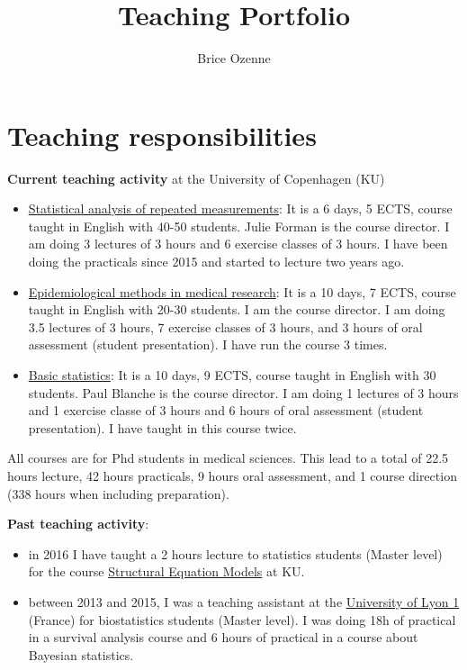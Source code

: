 \documentclass[12pt]{article}
\author{Brice Ozenne}
\date{}
\title{Teaching Portfolio}
\begin{document}
\maketitle

\section{Teaching responsibilities}
\label{sec:org6fdb8e1}

\textbf{Current teaching activity} at the University of Copenhagen (KU) 
\begin{itemize}
\item \href{https://absalon.ku.dk/courses/47665}{Statistical analysis of repeated measurements}: It is a 6
days, 5 ECTS, course taught in English with 40-50 students. Julie
Forman is the course director. \newline I am doing 3 lectures of 3
hours and 6 exercise classes of 3 hours. I have been doing the
practicals since 2015 and started to lecture two years ago.
\item \href{https://absalon.ku.dk/courses/58764}{Epidemiological methods in medical research}: It is a 10
days, 7 ECTS, course taught in English with 20-30 students. I am the
course director. \newline I am doing 3.5 lectures of 3 hours, 7
exercise classes of 3 hours, and 3 hours of oral assessment (student
presentation). I have run the course 3 times.
\item \href{http://paulblanche.com/files/BasicStat2023.html}{Basic statistics}: It is a 10 days, 9 ECTS, course taught in
English with 30 students. Paul Blanche is the course
director. \newline I am doing 1 lectures of 3 hours and 1 exercise
classe of 3 hours and 6 hours of oral assessment (student
presentation). I have taught in this course twice.
\end{itemize}

All courses are for Phd students in medical sciences. This lead to a
total of 22.5 hours lecture, 42 hours practicals, 9 hours oral
assessment, and 1 course direction (338 hours when including
preparation).

\bigskip

\noindent \textbf{Past teaching activity}:
\begin{itemize}
\item in 2016 I have taught a 2 hours lecture to statistics students
(Master level) for the course \href{https://absalon.instructure.com/courses/2385}{Structural Equation Models} at KU.
\item between 2013 and 2015, I was a teaching assistant at the
\href{https://mastersantepublique.univ-lyon1.fr/icap\_website/299/5382}{University
of Lyon 1} (France) for biostatistics students (Master level). I
was doing 18h of practical in a survival analysis course and 6 hours
of practical in a course about Bayesian statistics.
\end{itemize}
\end{document}
